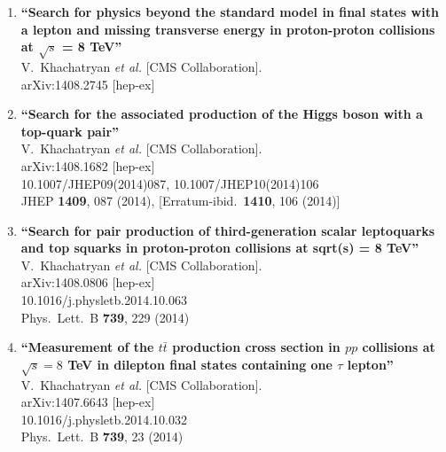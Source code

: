 \documentclass{article}
\begin{document}
\begin{enumerate}
\item%
{\bf ``Search for physics beyond the standard model in final states with a lepton and missing transverse energy in proton-proton collisions at $\sqrt{s}$ = 8 TeV''}
  \\{}V.~Khachatryan {\it et al.}  [CMS Collaboration].
  \\{}arXiv:1408.2745 [hep-ex]
  


\item%
{\bf ``Search for the associated production of the Higgs boson with a top-quark pair''}
  \\{}V.~Khachatryan {\it et al.}  [CMS Collaboration].
  \\{}arXiv:1408.1682 [hep-ex]
    \\{}10.1007/JHEP09(2014)087, 10.1007/JHEP10(2014)106
\\{}JHEP {\bf 1409}, 087 (2014), [Erratum-ibid.\  {\bf 1410}, 106 (2014)] %


\item%
{\bf ``Search for pair production of third-generation scalar leptoquarks and top squarks in proton-proton collisions at sqrt(s) = 8 TeV''}
  \\{}V.~Khachatryan {\it et al.}  [CMS Collaboration].
  \\{}arXiv:1408.0806 [hep-ex]
    \\{}10.1016/j.physletb.2014.10.063
\\{}Phys.\ Lett.\ B {\bf 739}, 229 (2014) %


\item%
{\bf ``Measurement of the $t \bar t$ production cross section in $pp$ collisions at $\sqrt s = 8$ TeV in dilepton final states containing one $\tau$ lepton''}
  \\{}V.~Khachatryan {\it et al.}  [CMS Collaboration].
  \\{}arXiv:1407.6643 [hep-ex]
    \\{}10.1016/j.physletb.2014.10.032
\\{}Phys.\ Lett.\ B {\bf 739}, 23 (2014) %



\end{enumerate}
\end{document}
